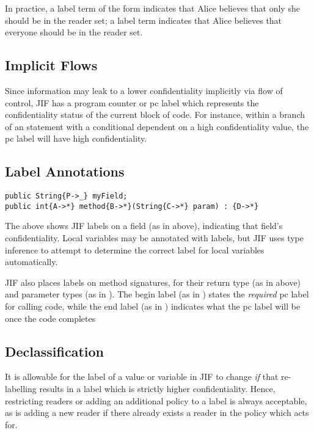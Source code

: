 In practice, a label term of the form  indicates that Alice believes that only she should be in the reader set; a label term  indicates that Alice believes that everyone should be in the reader set.

\subsection{Implicit Flows}

Since information may leak to a lower confidentiality implicitly via flow of control, JIF has a program counter or pc label which represents the confidentiality status of the current block of code. For instance, within a branch of an  statement with a conditional dependent on a high confidentiality value, the pc label will have high confidentiality.

\subsection{Label Annotations}

\begin{verbatim}
public String{P->_} myField;
public int{A->*} method{B->*}(String{C->*} param) : {D->*}
\end{verbatim}

The above shows JIF labels on a field (as in  above), indicating that field's confidentiality. Local variables may be annotated with labels, but JIF uses type inference to attempt to determine the correct label for local variables automatically.

JIF also places labels on method signatures, for their return type (as in  above) and parameter types (as in ). The begin label (as in ) states the \textit{required} pc label for calling code, while the end label (as in ) indicates what the pc label will be once the code completes

\subsection{Declassification}

It is allowable for the label of a value or variable in JIF to change \textit{if} that re-labelling results in a label which is strictly higher confidentiality. Hence, restricting readers or adding an additional policy to a label is always acceptable, as is adding a new reader  if there already exists a reader in the policy which  acts for.

